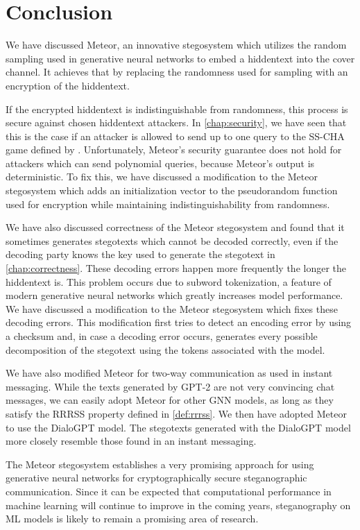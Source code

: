 \chapter{Conclusion}
\label{chap:conclusion}




%

We have discussed Meteor, an innovative stegosystem which utilizes the random sampling used in generative neural networks to embed a hiddentext into the cover channel.
It achieves that by replacing the randomness used for sampling with an encryption of the hiddentext.

If the encrypted hiddentext is indistinguishable from randomness, this process is secure against chosen hiddentext attackers.
In \autoref{chap:security}, we have seen that this is the case if an attacker is allowed to send up to one query to the SS-CHA game defined by \cite{Hopper2004}.
Unfortunately, Meteor's security guarantee does not hold for attackers which can send polynomial queries, because Meteor's output is deterministic.
To fix this, we have discussed a modification to the Meteor stegosystem which adds an initialization vector to the pseudorandom function used for encryption while maintaining indistinguishability from  randomness.

We have also discussed correctness of the Meteor stegosystem and found that it sometimes generates stegotexts which cannot be decoded correctly, even if the decoding party knows the key used to generate the stegotext in \autoref{chap:correctness}.
These decoding errors happen more frequently the longer the hiddentext is.
This problem occurs due to subword tokenization, a feature of modern generative neural networks which greatly increases model performance.
We have discussed a modification to the Meteor stegosystem which fixes these decoding errors.
This modification first tries to detect an encoding error by using a checksum and, in case a decoding error occurs, generates every possible decomposition of the stegotext using the tokens associated with the model.

We have also modified Meteor for two-way communication as used in instant messaging.
While the texts generated by GPT-2 are not very convincing chat messages, we can easily adopt Meteor for other GNN models, as long as they satisfy the RRRSS property defined in \autoref{def:rrrss}.
We then have adopted Meteor to use the DialoGPT model.
The stegotexts generated with the DialoGPT model more closely resemble those found in an instant messaging.

The Meteor stegosystem establishes a very promising approach for using generative neural networks for cryptographically secure steganographic communication. 
Since it can be expected that computational performance in machine learning will continue to improve in the coming years, steganography on ML models is likely to remain a promising area of research.